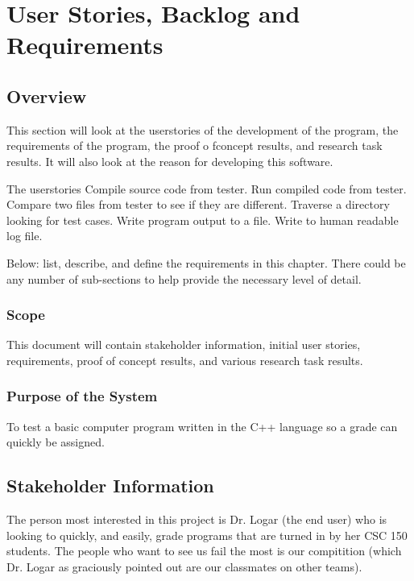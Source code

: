 \chapter{User Stories, Backlog and Requirements}
\section{Overview}


This section will look at the userstories of the development of the program, the requirements
of the program, the proof o fconcept results, and research task results. It will also look at the
reason for developing this software. 

 The userstories 
Compile source code from tester.   Run compiled code from tester.   Compare two files from tester to see
if they are different.   Traverse a directory looking for test cases.   Write program output to a file.   Write
to human readable log file.   

Below:   list, describe, and define the requirements in this chapter.  
There could be any number of sub-sections to help provide the necessary level of 
detail. 





\subsection{Scope}


This document will contain stakeholder information, 
initial user stories, requirements, proof of concept results, and various research 
task results. 



\subsection{Purpose of the System}
To test a basic computer program written in the C++ language so a grade can quickly be assigned.


\section{ Stakeholder Information}


The person most interested in this project is Dr. Logar (the end user) who is looking to quickly, 
and easily, grade programs that are turned in by her CSC 150 students.   The people who want
to see us fail the most is our compitition (which Dr. Logar as graciously pointed out are our classmates 
on other teams). 


